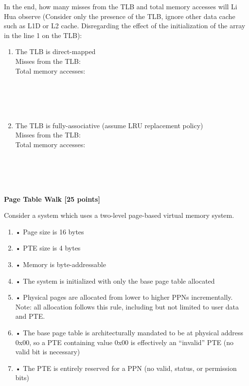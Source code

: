 \documentclass[addpoints, 12pt, answers]{exam}
\begin{document}
\begin{questions}
\begin{parts}
In the end, how many misses from the TLB and total memory accesses will Li Hua observe (Consider only the presence of the TLB, ignore other data cache such as L1D or L2 cache. Disregarding the effect of the initialization of the array in the line 1 on the TLB):


\begin{enumerate}
	\item The TLB is direct-mapped \\
	
	Misses from the TLB:\quad\underline{\quad\quad\quad\quad\quad\quad\quad\quad\quad}\\

	Total memory accesses:\quad\underline{\quad\quad\quad\quad\quad\quad\quad\quad\quad}\\

	\quad\\\quad\\\quad\\\quad\\\quad

	\item The TLB is fully-associative (assume LRU replacement policy) \\
	
	Misses from the TLB:\quad\underline{\quad\quad\quad\quad\quad\quad\quad\quad\quad}\\

	Total memory accesses:\quad\underline{\quad\quad\quad\quad\quad\quad\quad\quad\quad}\\

	\quad\\\quad\\\quad\\\quad\\\quad

\end{enumerate}

\end{parts}

\pagebreak

\question[25] \textbf{Page Table Walk [25 points]}

Consider a system which uses a two-level page-based virtual memory system. 
\begin{enumerate}[]
\item• Page size is 16 bytes 
\item• PTE size is 4 bytes 
\item• Memory is byte-addressable
\item• The system is initialized with only the base page table allocated 
\item• Physical pages are allocated from lower to higher PPNs incrementally. Note: all allocation follows this rule, including but not limited to user data and PTE. 
\item• The base page table is architecturally mandated to be at physical address 0x00, so a PTE 
containing value 0x00 is effectively an “invalid” PTE (no valid bit is necessary) 
\item• The PTE is entirely reserved for a PPN (no valid, status, or permission bits)  
\end{enumerate}


\end{questions}
\end{document}
